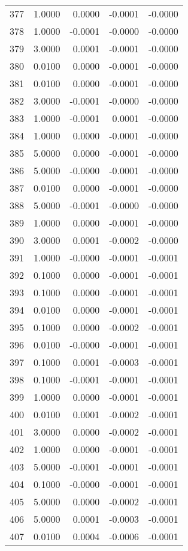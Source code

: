 \begin{longtable}{lrrrr}
377 & 1.0000 & 0.0000 & -0.0001 & -0.0000 \\
378 & 1.0000 & -0.0001 & -0.0000 & -0.0000 \\
379 & 3.0000 & 0.0001 & -0.0001 & -0.0000 \\
380 & 0.0100 & 0.0000 & -0.0001 & -0.0000 \\
381 & 0.0100 & 0.0000 & -0.0001 & -0.0000 \\
382 & 3.0000 & -0.0001 & -0.0000 & -0.0000 \\
383 & 1.0000 & -0.0001 & 0.0001 & -0.0000 \\
384 & 1.0000 & 0.0000 & -0.0001 & -0.0000 \\
385 & 5.0000 & 0.0000 & -0.0001 & -0.0000 \\
386 & 5.0000 & -0.0000 & -0.0001 & -0.0000 \\
387 & 0.0100 & 0.0000 & -0.0001 & -0.0000 \\
388 & 5.0000 & -0.0001 & -0.0000 & -0.0000 \\
389 & 1.0000 & 0.0000 & -0.0001 & -0.0000 \\
390 & 3.0000 & 0.0001 & -0.0002 & -0.0000 \\
391 & 1.0000 & -0.0000 & -0.0001 & -0.0001 \\
392 & 0.1000 & 0.0000 & -0.0001 & -0.0001 \\
393 & 0.1000 & 0.0000 & -0.0001 & -0.0001 \\
394 & 0.0100 & 0.0000 & -0.0001 & -0.0001 \\
395 & 0.1000 & 0.0000 & -0.0002 & -0.0001 \\
396 & 0.0100 & -0.0000 & -0.0001 & -0.0001 \\
397 & 0.1000 & 0.0001 & -0.0003 & -0.0001 \\
398 & 0.1000 & -0.0001 & -0.0001 & -0.0001 \\
399 & 1.0000 & 0.0000 & -0.0001 & -0.0001 \\
400 & 0.0100 & 0.0001 & -0.0002 & -0.0001 \\
401 & 3.0000 & 0.0000 & -0.0002 & -0.0001 \\
402 & 1.0000 & 0.0000 & -0.0001 & -0.0001 \\
403 & 5.0000 & -0.0001 & -0.0001 & -0.0001 \\
404 & 0.1000 & -0.0000 & -0.0001 & -0.0001 \\
405 & 5.0000 & 0.0000 & -0.0002 & -0.0001 \\
406 & 5.0000 & 0.0001 & -0.0003 & -0.0001 \\
407 & 0.0100 & 0.0004 & -0.0006 & -0.0001 \\

\end{longtable}
